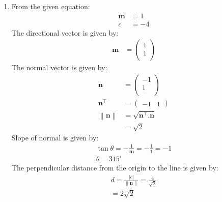 \documentclass[12pt]{article}
\providecommand{\norm}[1]{\left\lVert#1\right\rVert}
\newcommand{\myvec}[1]{\ensuremath{\begin{pmatrix}#1\end{pmatrix}}}
\let\vec\mathbf
\begin{document}
\begin{enumerate}
	
\item From the given equation:
         \begin{align}                                                                                                 \vec{m}&=1\\                                                                        			c&=-4
         \end{align}                                                                                          The directional vector is given by:
          \begin{align}
                  \vec{m}&=\myvec{1\\1\\}
          \end{align}
          The normal vector is given by:
                  \begin{align}
         \vec{n}&=\myvec{-1\\1\\}\\
          \vec{n}^\top&=\myvec{-1 & 1}\\
                       \norm{\vec{n}}&=\sqrt{\vec{n}^\top.\vec{n}}\\
                          &=\sqrt{2}
                          \end{align}
          Slope of normal is given by:
		\begin{align}                                                                                                 \tan\theta=-\frac{1}{\vec{m}}=-\frac{1}{1}=-1\\                             \theta=315^\circ
                \end{align}                                                                                 The perpendicular distance from the origin to the line is given by:                                          \begin{align}
			d=\frac{|c|}{\norm{\vec{n}}}=\frac{4}{\sqrt{2}}\\=2\sqrt{2}                                                      
                  \end{align}


\end{enumerate}
\end{document}
